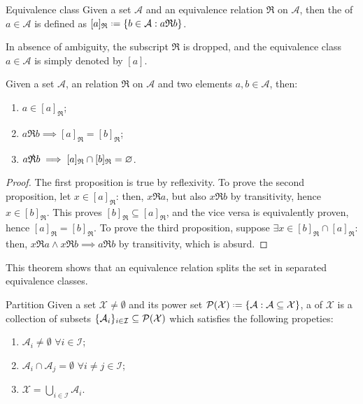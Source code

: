 \begin{definition}{Equivalence class}{}
  Given a set $ \mathcal{A} $ and an equivalence relation $ \mathfrak{R} $ on $ \mathcal{A} $, then the  of $ a \in \mathcal{A} $ is defined as $ [a]_\mathfrak{R} \defeq \{b \in \mathcal{A} : a \mathfrak{R} b\} $.
\end{definition}

In absence of ambiguity, the subscript $ \mathfrak{R} $ is dropped, and the equivalence class $ a \in \mathcal{A} $ is simply denoted by $ [a] $.

\begin{theorem}{}{}
  Given a set $ \mathcal{A} $, an  relation $ \mathfrak{R} $ on $ \mathcal{A} $ and two elements $ a , b \in \mathcal{A} $, then:
  \begin{enumerate}
    \item $ a \in [a]_\mathfrak{R} $;
    \item $ a \mathfrak{R} b \implies [a]_\mathfrak{R} = [b]_\mathfrak{R} $;
    \item $ a \slashed{\mathfrak{R}} b \implies [a]_\mathfrak{R} \cap [b]_\mathfrak{R} = \emptyset $.
  \end{enumerate}
\end{theorem}

\begin{proofbox}
  \begin{proof}
    The first proposition is true by reflexivity. To prove the second proposition, let $ x \in [a]_\mathfrak{R} $: then, $ x \mathfrak{R} a $, but also $ x \mathfrak{R} b $ by transitivity, hence $ x \in [b]_\mathfrak{R} $. This proves $ [b]_\mathfrak{R} \subseteq [a]_\mathfrak{R} $, and the vice versa is equivalently proven, hence $ [a]_\mathfrak{R} = [b]_\mathfrak{R} $. To prove the third proposition, suppose $ \exists x \in [b]_\mathfrak{R} \cap [a]_\mathfrak{R} $: then, $ x \mathfrak{R} a \land x \mathfrak{R} b \implies a \mathfrak{R} b $ by transitivity, which is absurd.
  \end{proof}
\end{proofbox}

This theorem shows that an equivalence relation splits the set in separated equivalence classes.

\begin{definition}{Partition}{}
  Given a set $ \mathcal{X} \neq \emptyset $ and its power set $ \pwst{\mathcal{X}} \defeq \{\mathcal{A} : \mathcal{A} \subseteq \mathcal{X}\} $, a  of $ \mathcal{X} $ is a collection of subsets $ \{\mathcal{A}_i\}_{i \in \mathcal{I}} \subseteq \pwst{\mathcal{X}} $ which satisfies the following propeties:
  \begin{enumerate}
    \item $ \mathcal{A}_i \neq \emptyset \,\,\forall i \in \mathcal{I} $;
    \item $ \mathcal{A}_i \cap \mathcal{A}_j = \emptyset \,\,\forall i \neq j \in \mathcal{I} $;
    \item $ \mathcal{X} = \bigcup_{i \in \mathcal{I}} \mathcal{A}_i $.
  \end{enumerate}
\end{definition}

